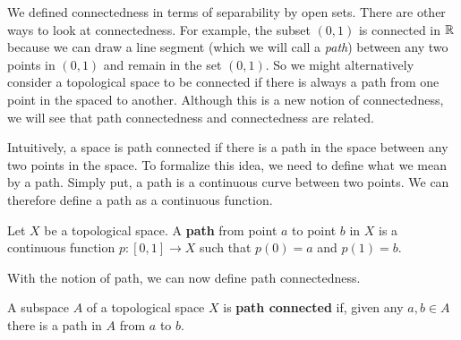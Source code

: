 \label{sec:Path_connected_topology}


\vspace*{-17 pt}

\vspace*{13 pt}


We defined connectedness in terms of separability by open sets. There are other ways to look at connectedness. For example, the subset $(0,1)$ is connected in $\mathbb{R}$ because we can draw a line segment (which we will call a \emph{path}) between any two points in $(0,1)$ and remain in the set $(0,1)$. So we might alternatively consider a topological space to be connected if there is always a path from one point in the spaced to another. Although this is a new notion of connectedness, we will see that path connectedness and connectedness are related.
 
Intuitively, a space is path connected if there is a path in the space between any two points in the space. To formalize this idea, we need to define what we mean by a path. Simply put, a path is a continuous curve between two points. We can therefore define a path as a continuous function.

\begin{definition} Let $X$ be a topological space. A \textbf{path} from point $a$ to point $b$ in $X$ is a continuous function $p: [0,1] \to X$ such that $p(0) = a$ and $p(1)=b$. 
\end{definition}

With the notion of path, we can now define path connectedness.

\begin{definition} A subspace $A$ of a topological space $X$ is \textbf{path connected} if, given any $a, b \in A$ there is a path in $A$ from $a$ to $b$.
\end{definition}

